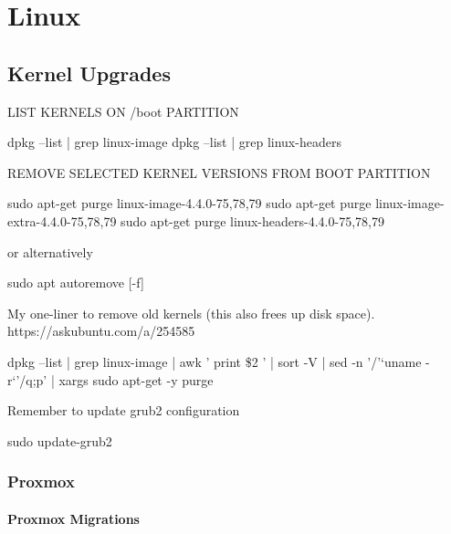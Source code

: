 
\chapter{Linux}

\section{Kernel Upgrades}

LIST KERNELS ON /boot PARTITION

\begin{txt}
dpkg --list | grep linux-image
dpkg --list | grep linux-headers
\end{txt}

REMOVE SELECTED KERNEL VERSIONS FROM BOOT PARTITION

\begin{txt}
sudo apt-get purge linux-image-4.4.0-{75,78,79}
sudo apt-get purge linux-image-extra-4.4.0-{75,78,79}
sudo apt-get purge linux-headers-4.4.0-{75,78,79}
\end{txt}

or alternatively

\begin{txt}
sudo apt autoremove [-f]
\end{txt}

My one-liner to remove old kernels (this also frees up disk space). https://askubuntu.com/a/254585

\begin{txt}
dpkg --list | grep linux-image | awk '{ print \$2 }' | sort -V | sed -n '/'`uname -r`'/q;p' | xargs sudo apt-get -y purge
\end{txt}

Remember to update grub2 configuration

\begin{txt}
sudo update-grub2
\end{txt}

\newpage

\subsection{Proxmox}

\subsubsection{Proxmox Migrations}

